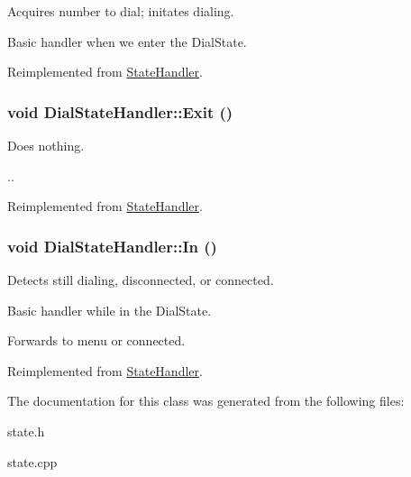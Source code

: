 Acquires number to dial; initates dialing. 

Basic handler when we enter the DialState.

Reimplemented from \hyperlink{classStateHandler_c08036e743cf5172d6931cf3b6d321c6}{StateHandler}.\hypertarget{classDialStateHandler_5ad70749559b320cb64db1e04db04622}{
\subsubsection[{Exit}]{\setlength{\rightskip}{0pt plus 5cm}void DialStateHandler::Exit ()}}
\label{classDialStateHandler_5ad70749559b320cb64db1e04db04622}


Does nothing. 

.. 

Reimplemented from \hyperlink{classStateHandler_5ce0f2cb3d4a9f5aca137d47eac75c1e}{StateHandler}.\hypertarget{classDialStateHandler_94e5a408fd9758b535ec28780b53b7a8}{
\subsubsection[{In}]{\setlength{\rightskip}{0pt plus 5cm}void DialStateHandler::In ()}}
\label{classDialStateHandler_94e5a408fd9758b535ec28780b53b7a8}


Detects still dialing, disconnected, or connected. 

Basic handler while in the DialState.

Forwards to menu or connected. 

Reimplemented from \hyperlink{classStateHandler_cee16f855e7354d21abafa47acd1046c}{StateHandler}.

The documentation for this class was generated from the following files:\begin{CompactItemize}
\item 
state.h\item 
state.cpp\end{CompactItemize}
